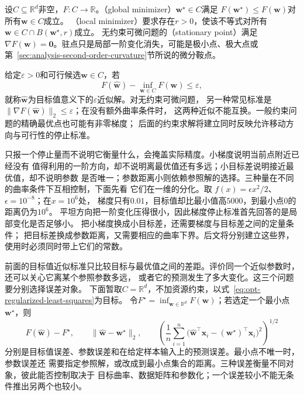 \begin{definition}
\label{def:opt-solutions-stationarity}
设$C\subseteq\mathbb R^d$非空，$F:C\to\mathbb R$。（global minimizer）$\bm{w}^{\star}\in C$满足
$F(\bm{w}^{\star})\leq F(\bm{w})$对所有$\bm{w}\in C$成立。
（local minimizer）要求存在$r>0$，使该不等式对所有
$\bm w\in C\cap B(\bm w^\star,r)$成立。
无约束可微问题的（stationary point）满足
$\nabla F(\bm{w})=\bm{0}$。驻点只是局部一阶变化消失，可能是极小点、极大点或
第~\ref{sec:analysis-second-order-curvature}节所说的微分鞍点。
\end{definition}
给定$\varepsilon>0$和可行候选$\widehat{\bm w}\in C$，若
\[
  F(\widehat{\bm{w}})-\inf_{\bm{w}\in C}F(\bm{w})\leq\varepsilon,
\]
就称$\widehat{\bm{w}}$为目标值意义下的$\varepsilon$近似解。对无约束可微问题，
另一种常见标准是
$\lVert\nabla F(\widehat{\bm{w}})\rVert_2\leq\varepsilon$；在没有额外曲率条件时，
这两种近似不能互换。一般约束问题的精确最优点也可能有非零梯度；
后面的约束求解将建立同时反映允许移动方向与可行性的停止标准。

只报一个停止量而不说明它衡量什么，会掩盖实际精度。小梯度说明当前点附近已经没有
值得利用的一阶方向，却不说明离最优值还有多远；小目标差说明接近最优值，却不说明参数
是否唯一；参数距离小则依赖参照解的选择。三种量在不同的曲率条件下互相控制，下面先看
它们在一维的分化。取
$f(x)=\epsilon x^2/2$、$\epsilon=10^{-8}$；在$x=10^6$处，
梯度只有$0.01$，目标值却比最小值高$5000$，到最小点$0$的距离仍为$10^6$。
平坦方向把一阶变化压得很小，因此梯度停止标准首先回答的是局部变化是否足够小。
把小梯度换成小目标差，还需要梯度与目标差之间的定量条件；
把目标差换成参数距离，又需要相应的曲率下界。后文将分别建立这些界，
使用时必须同时带上它们的常数。

前面的目标值近似标准只比较目标与最优值之间的差距。评价同一个近似参数时，还可以关心它离某个参照参数多远，
或者它的预测发生了多大变化。这三个问题要分别选择误差对象。
下面暂取$C=\mathbb{R}^d$，不加资源约束，以式~\eqref{eq:opt-regularized-least-squares}为目标。
令$F^\star=\inf_{\bm{w}\in\mathbb{R}^d}F(\bm{w})$；若选定一个最小点
$\bm{w}^\star$，则
\[
  F(\widehat{\bm{w}})-F^\star,\qquad
  \lVert\widehat{\bm{w}}-\bm{w}^\star\rVert_2,\qquad
  \left(
    \frac{1}{n}\sum_{i=1}^{n}
    \bigl(
      \widehat{\bm{w}}^{\top}\bm{x}_i
      -(\bm{w}^\star)^{\top}\bm{x}_i
    \bigr)^2
  \right)^{1/2}
\]
分别是目标值误差、参数误差和在给定样本输入上的预测误差。最小点不唯一时，参数误差还
需要指定参照解，或改成到最小点集合的距离。三种误差衡量不同对象，彼此能否控制取决于
目标曲率、数据矩阵和参数化；一个误差较小不能无条件推出另两个也较小。

